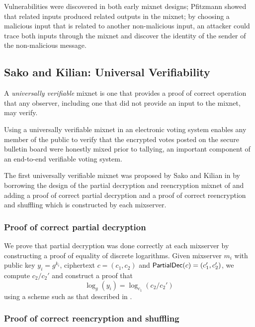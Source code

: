 Vulnerabilities were discovered in both early mixnet designs; Pfitzmann \cite{pfitzmann90, pfitzmann95} showed that related inputs produced related outputs in the mixnet; by choosing a malicious input that is related to another non-malicious input, an attacker could trace both inputs through the mixnet and discover the identity of the sender of the non-malicious message.

\subsection{Sako and Kilian: Universal Verifiability}

\begin{definition}
A \emph{universally verifiable} mixnet is one that provides a proof of correct operation that any observer, including one that did not provide an input to the mixnet, may verify.
\end{definition}

Using a universally verifiable mixnet in an electronic voting system enables any member of the public to verify that the encrypted votes posted on the secure bulletin board were honestly mixed prior to tallying, an important component of an end-to-end verifiable voting system.

The first universally verifiable mixnet was proposed by Sako and Kilian in \cite{sako95} by borrowing the design of the partial decryption and reencryption mixnet of \cite{park94} and adding a proof of correct partial decryption and a proof of correct reencryption and shuffling which is constructed by each mixserver.

\subsubsection{Proof of correct partial decryption}

We prove that partial decryption was done correctly at each mixserver by constructing a proof of equality of discrete logarithms. Given mixserver $m_i$ with public key $y_i = g^{k_i}$, ciphertext $c = (c_1, c_2)$ and $\operatorname{\mathsf{PartialDec}}(c) = (c_1', c_2')$, we compute $c_2 / c_2'$ and construct a proof that
$$\log_{g}(y_i) = \log_{c_1}(c_2 / c_2')$$
using a scheme such as that described in \cite{chaum-pedersen}.

\subsubsection{Proof of correct reencryption and shuffling}

